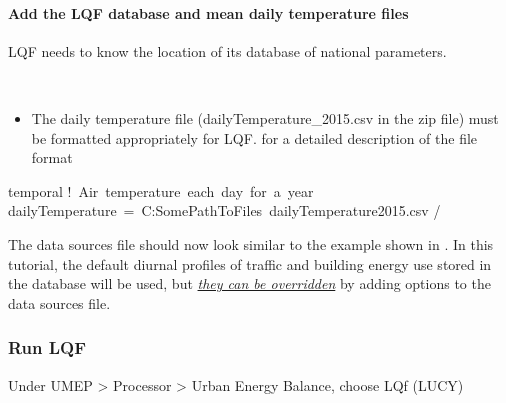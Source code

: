 \documentclass[letterpaper,10pt,english]{sphinxmanual}
\let\sphinxpxdimen\pdfpxdimen\else\newdimen\sphinxpxdimen
\begin{document}
\paragraph{Add the LQF database and mean daily temperature files}
\label{\detokenize{Tutorials/LQF:add-the-lqf-database-and-mean-daily-temperature-files}}
LQF needs to know the location of its database of national parameters.

%
\begin{sphinxVerbatim}[commandchars=\\\{\}]
     
\end{sphinxVerbatim}
\begin{itemize}
\item {} 
The daily temperature file (dailyTemperature\_2015.csv in the zip
file) must be formatted appropriately for LQF.  for a detailed description
of the file format

\end{itemize}

%
\begin{sphinxVerbatim}[commandchars=\\\{\}]
\PYGZam{}temporal
    ! Air temperature each day for a year
    dailyTemperature = \PYGZsq{}C:\PYGZbs{}Some\PYGZbs{}Path\PYGZbs{}To\PYGZbs{}Files \PYGZbs{}dailyTemperature\PYGZus{}2015.csv\PYGZsq{}
/
\end{sphinxVerbatim}

The data sources file should now look similar to the example shown in
. In this tutorial, the
default diurnal profiles of traffic and building energy use stored in
the database will be used, but {\hyperref[\detokenize{Tutorials/LQF:Tutorial_2a:_Custom_diurnal_profiles}]{\emph{they can be
overridden}}} by adding options
to the data sources file.


\subsubsection{Run LQF}
\label{\detokenize{Tutorials/LQF:run-lqf}}
Under UMEP \textgreater{} Processor \textgreater{} Urban Energy Balance, choose LQf (LUCY)

\begin{figure}[htbp]
\centering

\noindent\sphinxincludegraphics[width=300\sphinxpxdimen]{{LQF_Tutorial_RunUMEP}.png}
\end{figure}
\end{document}
